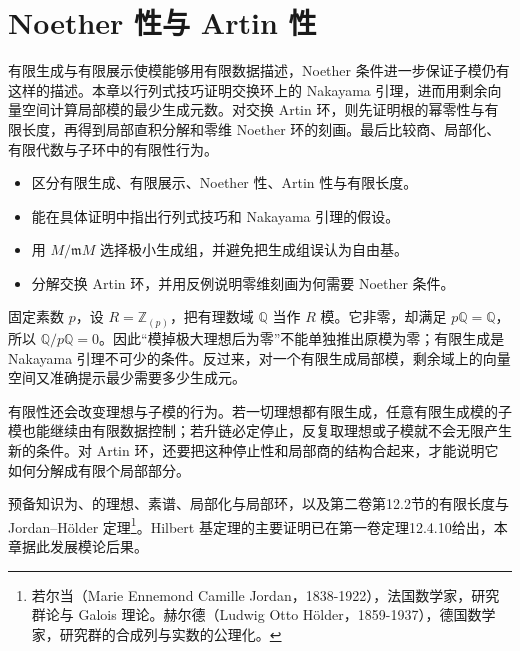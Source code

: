 
\chapter{Noether 性与 Artin 性}
\label{b3:ch:03}

\begin{chapterabstract}
	有限生成与有限展示使模能够用有限数据描述，Noether 条件进一步保证子模仍有这样的描述。本章以行列式技巧证明交换环上的 Nakayama 引理，进而用剩余向量空间计算局部模的最少生成元数。对交换 Artin 环，则先证明根的幂零性与有限长度，再得到局部直积分解和零维 Noether 环的刻画。最后比较商、局部化、有限代数与子环中的有限性行为。
\end{chapterabstract}

\begin{learninggoals}
	\begin{itemize}
		\item 区分有限生成、有限展示、Noether 性、Artin 性与有限长度。
		\item 能在具体证明中指出行列式技巧和 Nakayama 引理的假设。
		\item 用 \(M/\mathfrak mM\) 选择极小生成组，并避免把生成组误认为自由基。
		\item 分解交换 Artin 环，并用反例说明零维刻画为何需要 Noether 条件。
	\end{itemize}
\end{learninggoals}

固定素数 \(p\)，设 \(R=\mathbb Z_{(p)}\)，把有理数域 \(\mathbb Q\) 当作 \(R\) 模。它非零，却满足 \(p\mathbb Q=\mathbb Q\)，所以 \(\mathbb Q/p\mathbb Q=0\)。因此“模掉极大理想后为零”不能单独推出原模为零；有限生成是 Nakayama 引理不可少的条件。反过来，对一个有限生成局部模，剩余域上的向量空间又准确提示最少需要多少生成元。

\ProseParagraphBreak

有限性还会改变理想与子模的行为。若一切理想都有限生成，任意有限生成模的子模也能继续由有限数据控制；若升链必定停止，反复取理想或子模就不会无限产生新的条件。对 Artin 环，还要把这种停止性和局部商的结构合起来，才能说明它如何分解成有限个局部部分。

\ProseParagraphBreak

预备知识为、的理想、素谱、局部化与局部环，以及第二卷第12.2节的有限长度与 Jordan–Hölder 定理\footnote{若尔当（Marie Ennemond Camille Jordan，1838-1922），法国数学家，研究群论与 Galois 理论。赫尔德（Ludwig Otto Hölder，1859-1937），德国数学家，研究群的合成列与实数的公理化。}。Hilbert 基定理的主要证明已在第一卷定理12.4.10给出，本章据此发展模论后果。

